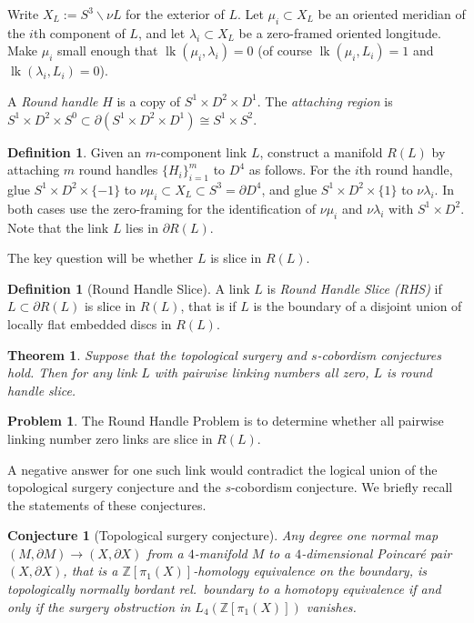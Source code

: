 \documentclass[11pt, oneside]{amsart}
\numberwithin{equation}{section}
\theoremstyle{plain}
\newtheorem{theorem}[equation]{Theorem}
\newtheorem{conjecture}[equation]{Conjecture}
\theoremstyle{definition}
\newtheorem{definition}[equation]{Definition}
\newtheorem{problem}[equation]{Problem}
\theoremstyle{remark}
\numberwithin{equation}{section}
\begin{document}
Write $X_L := S^3 {{\smallsetminus}} \nu L$ for the exterior of $L$.
Let $\mu_{i} \subset X_L$ be an oriented meridian of the $i$th component of $L$, and let $\lambda_i \subset X_L$ be a zero-framed oriented longitude.  Make $\mu_i$ small enough that $\operatorname{lk}(\mu_i,\lambda_i)=0$  (of course $\operatorname{lk}(\mu_i,L_i) =1$ and $\operatorname{lk}(\lambda_i,L_i)=0$).

A \emph{Round handle} $H$ is a copy of $S^1 \times D^2 \times D^1$.  The \emph{attaching region} is $S^1 \times D^2 \times S^0 \subset \partial(S^1 \times D^2 \times D^1) \cong S^1 \times S^2$.

\begin{definition}
  Given an $m$-component link $L$, construct a manifold $R(L)$ by attaching $m$ round handles $\{H_i\}_{i=1}^m$ to $D^4$ as follows.  For the $i$th round handle, glue $S^1 \times D^2 \times \{-1\}$ to $\nu \mu_i \subset X_L \subset S^3= \partial D^4$, and glue $S^1 \times D^2 \times \{1\}$ to $\nu \lambda_i$.  In both cases use the zero-framing for the identification of $\nu \mu_i$ and $\nu \lambda_i$ with $S^1 \times D^2$.
  Note that the link $L$ lies in $\partial R(L)$.
\end{definition}

\noindent The key question will be whether $L$ is slice in $R(L)$.

\begin{definition}[Round Handle Slice]
  A link $L$ is \emph{Round Handle Slice (RHS)} if $L \subset \partial R(L)$ is slice in $R(L)$, that is if $L$ is the boundary of a disjoint union of locally flat embedded discs in $R(L)$.
\end{definition}

\begin{theorem}\label{theorem:RHP}
Suppose that the topological surgery and $s$-cobordism conjectures hold.  Then for any link $L$ with pairwise linking numbers all zero, $L$ is round handle slice.
\end{theorem}

\begin{problem}
The Round Handle Problem is to determine whether all pairwise linking number zero links are slice in $R(L)$.
\end{problem}

A negative answer for one such link would contradict the logical union of the topological surgery conjecture and the $s$-cobordism conjecture.
We briefly recall the statements of these conjectures.

\begin{conjecture}[Topological surgery conjecture]
  Any degree one normal map $(M,\partial M) \to (X,\partial X)$ from a $4$-manifold $M$ to a $4$-dimensional Poincar\'{e} pair $(X,\partial X)$, that is a ${\mathbb Z}[\pi_1(X)]$-homology equivalence on the boundary, is topologically normally bordant rel.\ boundary to a homotopy equivalence if and only if the surgery obstruction in $L_4({\mathbb Z}[\pi_1(X)])$ vanishes.
\end{conjecture}
\end{document}
